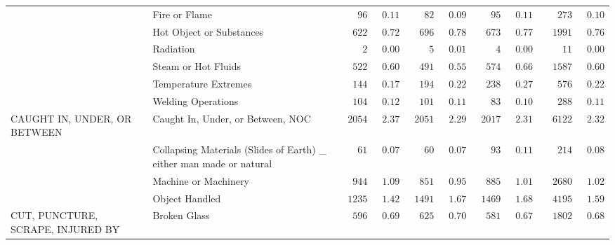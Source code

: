 \documentclass[9pt, oneside]{article}   	%
\begin{document}
\begin{longtable}{p{1.8in}p{2.2in}cccccccc}
 & Fire or Flame  & $\phantom{000}96$ & $\phantom{0}0.11$ & $\phantom{000}82$ & $\phantom{0}0.09$ & $\phantom{000}95$ & $\phantom{0}0.11$ & $\phantom{000}273$ & $\phantom{0}0.10$ \\
 & Hot Object or Substances  & $\phantom{00}622$ & $\phantom{0}0.72$ & $\phantom{00}696$ & $\phantom{0}0.78$ & $\phantom{00}673$ & $\phantom{0}0.77$ & $\phantom{00}1991$ & $\phantom{0}0.76$ \\
 & Radiation  & $\phantom{0000}2$ & $\phantom{0}0.00$ & $\phantom{0000}5$ & $\phantom{0}0.01$ & $\phantom{0000}4$ & $\phantom{0}0.00$ & $\phantom{0000}11$ & $\phantom{0}0.00$ \\
 & Steam or Hot Fluids  & $\phantom{00}522$ & $\phantom{0}0.60$ & $\phantom{00}491$ & $\phantom{0}0.55$ & $\phantom{00}574$ & $\phantom{0}0.66$ & $\phantom{00}1587$ & $\phantom{0}0.60$ \\
 & Temperature Extremes  & $\phantom{00}144$ & $\phantom{0}0.17$ & $\phantom{00}194$ & $\phantom{0}0.22$ & $\phantom{00}238$ & $\phantom{0}0.27$ & $\phantom{000}576$ & $\phantom{0}0.22$ \\
 & Welding Operations  & $\phantom{00}104$ & $\phantom{0}0.12$ & $\phantom{00}101$ & $\phantom{0}0.11$ & $\phantom{000}83$ & $\phantom{0}0.10$ & $\phantom{000}288$ & $\phantom{0}0.11$ \\
CAUGHT IN, UNDER, OR BETWEEN & Caught In, Under, or Between, NOC  & $\phantom{0}2054$ & $\phantom{0}2.37$ & $\phantom{0}2051$ & $\phantom{0}2.29$ & $\phantom{0}2017$ & $\phantom{0}2.31$ & $\phantom{00}6122$ & $\phantom{0}2.32$ \\
 & Collapsing Materials (Slides of Earth) \_ either man made or natural  & $\phantom{000}61$ & $\phantom{0}0.07$ & $\phantom{000}60$ & $\phantom{0}0.07$ & $\phantom{000}93$ & $\phantom{0}0.11$ & $\phantom{000}214$ & $\phantom{0}0.08$ \\
 & Machine or Machinery  & $\phantom{00}944$ & $\phantom{0}1.09$ & $\phantom{00}851$ & $\phantom{0}0.95$ & $\phantom{00}885$ & $\phantom{0}1.01$ & $\phantom{00}2680$ & $\phantom{0}1.02$ \\
 & Object Handled  & $\phantom{0}1235$ & $\phantom{0}1.42$ & $\phantom{0}1491$ & $\phantom{0}1.67$ & $\phantom{0}1469$ & $\phantom{0}1.68$ & $\phantom{00}4195$ & $\phantom{0}1.59$ \\
CUT, PUNCTURE, SCRAPE, INJURED BY & Broken Glass  & $\phantom{00}596$ & $\phantom{0}0.69$ & $\phantom{00}625$ & $\phantom{0}0.70$ & $\phantom{00}581$ & $\phantom{0}0.67$ & $\phantom{00}1802$ & $\phantom{0}0.68$ \\

\end{longtable}
\end{document}
